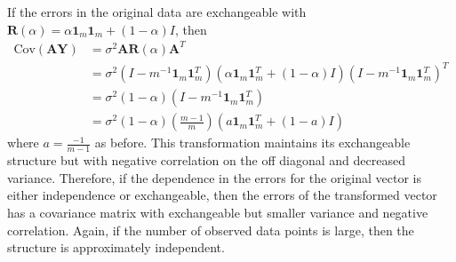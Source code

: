 \documentclass[12pt]{article}
\newcommand{\B}[0]{\mathbf}
\newcommand{\Cov}[0]{\text{Cov}}
\begin{document}
 If the errors in the original data are exchangeable with  $\B R(\alpha) = \alpha\B 1_{m} \B 1_{m} + (1-\alpha) I$, then 
 \begin{align*}
 \Cov(\B A\B Y) &= \sigma^{2}\B A\B R(\alpha)\B A^{T}\\
 &= \sigma^{2}(I-m^{-1}\B1_{m}\B1_{m}^{T})(\alpha\B1_{m}\B1_{m}^{T}+(1-\alpha)I)(I-m^{-1}\B1_{m}\B1_{m}^{T})^{T}\\
 &= \sigma^{2}(1-\alpha)(I-m^{-1}\B1_{m}\B1_{m}^{T})\\
 &=\sigma^{2}(1-\alpha)\left(\frac{m-1}{m}\right)(a\B 1_{m}\B 1_{m}^{T}+ (1-a)I)
 \end{align*} 
 where $a=\frac{-1}{m-1}$ as before. This transformation maintains its exchangeable structure but with negative correlation on the off diagonal and decreased variance. Therefore, if the dependence in the errors for the original vector is either independence or exchangeable, then the errors of the transformed vector has a covariance matrix with exchangeable but smaller variance and negative correlation. Again, if the number of observed data points is large, then the structure is approximately independent.\\
 
\end{document}
